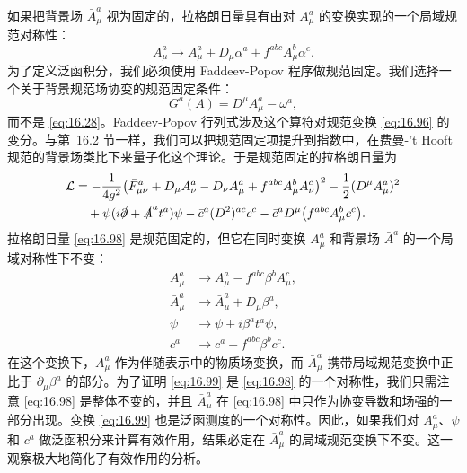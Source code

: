如果把背景场 $\bar{A}^a_\mu$ 视为固定的，拉格朗日量具有由对 $A^a_\mu$ 的变换实现的一个局域规范对称性：
\begin{equation}
  A^a_\mu \to A^a_\mu + D_\mu\alpha^a + f^{abc}A^b_\mu\alpha^c .
  \label{eq:16.96}
\end{equation}
为了定义泛函积分，我们必须使用 Faddeev-Popov 程序做规范固定。我们选择一个关于背景规范场协变的规范固定条件：
\begin{equation}
  G^a(A) = D^\mu A^a_\mu - \omega^a ,
  \label{eq:16.97}
\end{equation}
而不是 \eqref{eq:16.28}。Faddeev-Popov 行列式涉及这个算符对规范变换 \eqref{eq:16.96} 的变分。与第~16.2 节一样，我们可以把规范固定项提升到指数中，在费曼-'t Hooft 规范的背景场类比下来量子化这个理论。于是规范固定的拉格朗日量为
\begin{equation}
  \begin{aligned}
    \mathcal{L} &= -\frac{1}{4g^2}\bigl( \bar{F}^a_{\mu\nu} + D_\mu A^a_\nu
      - D_\nu A^a_\mu + f^{abc}A^b_\mu A^c_\nu \bigr)^2
      - \frac{1}{2}(D^\mu A^a_\mu)^2\\
    &\quad + \bar{\psi}(i\slashed{\partial} + \slashed{A}^a t^a)\psi
      - \bar{c}^a(D^2)^{ac}c^c - \bar{c}^a D^\mu\bigl( f^{abc}A^b_\mu c^c
        \bigr) .
  \end{aligned}
  \label{eq:16.98}
\end{equation}
拉格朗日量 \eqref{eq:16.98} 是规范固定的，但它在同时变换 $A^a_\mu$ 和背景场 $\bar{A}^a$ 的一个局域对称性下不变：
\begin{equation}
  \begin{aligned}
    A^a_\mu &\to A^a_\mu - f^{abc}\beta^b A^c_\mu,\\
    \bar{A}^a_\mu &\to \bar{A}^a_\mu + D_\mu\beta^a,\\
    \psi &\to \psi + i\beta^a t^a\psi,\\
    c^a &\to c^a - f^{abc}\beta^b c^c .
  \end{aligned}
  \label{eq:16.99}
\end{equation}
在这个变换下，$A^a_\mu$ 作为伴随表示中的物质场变换，而 $\bar{A}^a_\mu$ 携带局域规范变换中正比于 $\partial_\mu\beta^a$ 的部分。为了证明 \eqref{eq:16.99} 是 \eqref{eq:16.98} 的一个对称性，我们只需注意 \eqref{eq:16.98} 是整体不变的，并且 $\bar{A}^a_\mu$ 在 \eqref{eq:16.98} 中只作为协变导数和场强的一部分出现。变换 \eqref{eq:16.99} 也是泛函测度的一个对称性。因此，如果我们对 $A^a_\mu$、$\psi$ 和 $c^a$ 做泛函积分来计算有效作用，结果必定在 $\bar{A}^a_\mu$ 的局域规范变换下不变。这一观察极大地简化了有效作用的分析。

